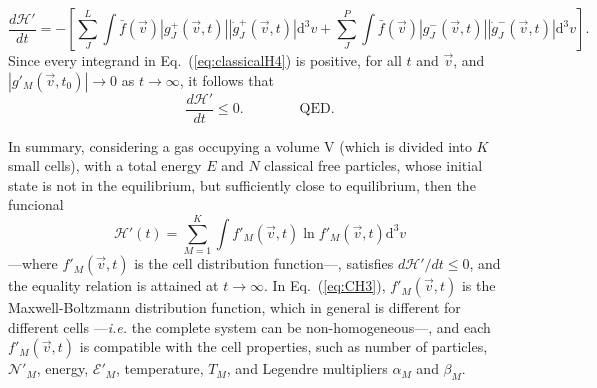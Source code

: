 %
\begin{equation}\label{eq:classicalH4}
    \frac{d\mathcal{H}'}{dt}=-\left[
      \sum_J^{L}\int\bar f(\vec{v})|g_J^{+}(\vec{v},t)|
        |\dot g_J^{+}(\vec{v},t)|\mathrm{d}^3v
      +\sum_J^{P}\int\bar f(\vec{v})|g_J^{-}(\vec{v},t)|
      |\dot g_J^{-}(\vec{v},t)|\mathrm{d}^3v 
    \right].
\end{equation}
%
Since every integrand in Eq.~(\ref{eq:classicalH4}) is positive,
for all $t$ and $\vec v$, and
$\left|g'_M(\vec{v},t_0)\right|\to 0$ as $t\to\infty$, it follows that
%
\begin{equation}\label{eq:dHpdtleq0}
 \frac{d\mathcal{H}'}{dt}\leq0.\qquad\qquad\textrm{QED.}
\end{equation}
%

In summary, considering a gas occupying a volume V (which is divided into $K$ small cells), with a
total energy $E$ and $N$ classical free particles, whose initial state is not in the equilibrium,
but sufficiently close to equilibrium, then the funcional
%
\begin{equation}\label{eq:CH3}
   \mathcal{H}'(t)=\sum_{M=1}^{K}\int f'_M(\vec{v},t) \ln f'_M(\vec{v},t)\mathrm{d}^3v
\end{equation}
%
---where $f'_M(\vec{v},t)$ is the cell distribution function---,
satisfies $d\mathcal{H}'/dt\leq0$, and the equality relation is attained at $t\to\infty$.
In Eq.~(\ref{eq:CH3}), $f'_M(\vec{v},t)$ is the Maxwell-Boltzmann distribution
function, which in general is different for different cells ---\textit{i.e.} the complete system
can be non-homogeneous---, and each $f'_M(\vec v,t)$ is compatible
with the cell properties, such as number of particles, $\mathcal{N}'_M$, energy, $\mathcal{E}'_M$, temperature,
$T_M$, and Legendre multipliers $\alpha_M$ and $\beta_M$. 


\begin{comment}
Joining both results, we can say the following statement:
Consider a classical gas in a total volume $V$ (divided in $K$ cells of equal
volume elements), total energy $E$ and total number of free particles $N$.
Consider also the system has inhomogeneities and suffers a relaxation process.
If we define the following functional
%
\begin{equation}\label{CH3}
   \mathcal{H}'(t)=\sum_{M=1}^{K}\int f_M(\vec{v},t) \ln f_M(\vec{v},t)\mathrm{d}^3v,
\end{equation}
%
where $f_M(\vec{v},t)$ is the local distribution function of each cell in the
system, then in the first-order approximation
%
\begin{equation}
    \frac{d\mathcal{H}'}{dt} \leq 0.
\end{equation}
%
This statement will be the classical $H$-theorem with inhomogeneities.

In the next section, we present a proposal quantum version of the
$H$-theorem defined by Tolman and our proposal quantum version of the $H$
theorem applying the method of the volume divided into cells.
\end{comment}


